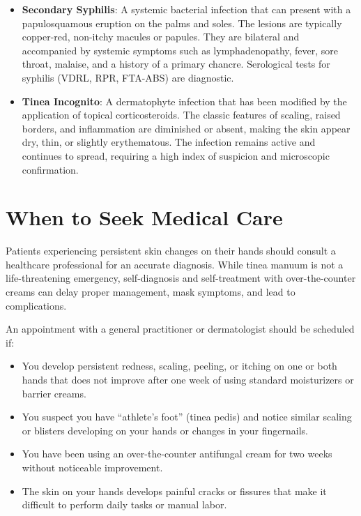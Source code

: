 \begin{itemize}
    \item \textbf{Secondary Syphilis}: A systemic bacterial infection that can present with a papulosquamous eruption on the palms and soles. The lesions are typically copper-red, non-itchy macules or papules. They are bilateral and accompanied by systemic symptoms such as lymphadenopathy, fever, sore throat, malaise, and a history of a primary chancre. Serological tests for syphilis (VDRL, RPR, FTA-ABS) are diagnostic.
    \item \textbf{Tinea Incognito}: A dermatophyte infection that has been modified by the application of topical corticosteroids. The classic features of scaling, raised borders, and inflammation are diminished or absent, making the skin appear dry, thin, or slightly erythematous. The infection remains active and continues to spread, requiring a high index of suspicion and microscopic confirmation.
\end{itemize}

\section*{When to Seek Medical Care}
Patients experiencing persistent skin changes on their hands should consult a healthcare professional for an accurate diagnosis. While tinea manuum is not a life-threatening emergency, self-diagnosis and self-treatment with over-the-counter creams can delay proper management, mask symptoms, and lead to complications.

An appointment with a general practitioner or dermatologist should be scheduled if:
\begin{itemize}
    \item You develop persistent redness, scaling, peeling, or itching on one or both hands that does not improve after one week of using standard moisturizers or barrier creams.
    \item You suspect you have ``athlete's foot'' (tinea pedis) and notice similar scaling or blisters developing on your hands or changes in your fingernails.
    \item You have been using an over-the-counter antifungal cream for two weeks without noticeable improvement.
    \item The skin on your hands develops painful cracks or fissures that make it difficult to perform daily tasks or manual labor.
\end{itemize}

